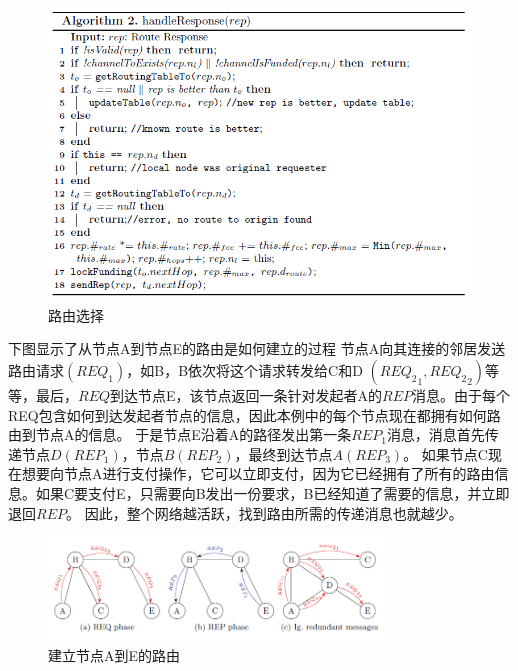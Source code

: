 \documentclass[12pt,a4paper]{article}
\begin{document}
\begin{figure}[htb]
\centering
\includegraphics[width=12cm]{select_route}
\caption{路由选择}
\end{figure}

下图显示了从节点A到节点E的路由是如何建立的过程
节点A向其连接的邻居发送路由请求$({REQ}_1)$，如B，B依次将这个请求转发给C和D $({{REQ}_2}_1, {{REQ}_2}_2)$等等，最后，$REQ$到达节点E，该节点返回一条针对发起者A的$REP$消息。由于每个REQ包含如何到达发起者节点的信息，因此本例中的每个节点现在都拥有如何路由到节点A的信息。
于是节点E沿着A的路径发出第一条${REP}_1$消息，消息首先传递节点$D({REP}_1)$，节点$B ({REP}_2)$，最终到达节点$A ({REP}_3)$。
如果节点C现在想要向节点A进行支付操作，它可以立即支付，因为它已经拥有了所有的路由信息。如果C要支付E，只需要向B发出一份要求，B已经知道了需要的信息，并立即退回$REP$。
因此，整个网络越活跃，找到路由所需的传递消息也就越少。

\begin{figure}[htb]
\centering
\includegraphics[width=9cm]{create_route}
\caption{建立节点A到E的路由}
\end{figure}



\end{document}
